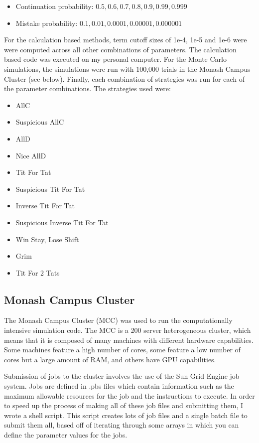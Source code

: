 \documentclass[a4paper,12pt]{article}
\begin{document}
\begin{itemize}
    \item Continuation probability: $0.5, 0.6, 0.7, 0.8, 0.9, 0.99, 0.999$
    \item Mistake probability: $0.1, 0.01, 0.0001, 0.00001, 0.000001$
\end{itemize}

For the calculation based methods, term cutoff sizes of 1e-4, 1e-5 and 1e-6 were were computed across all other combinations of parameters.
The calculation based code was executed on my personal computer.
For the Monte Carlo simulations, the simulations were run with 100,000 trials in the Monash Campus Cluster (see below).
Finally, each combination of strategies was run for each of the parameter combinations.
The strategies used were:

\begin{itemize}
    \item AllC
    \item Suspicious AllC
    \item AllD
    \item Nice AllD
    \item Tit For Tat
    \item Suspicious Tit For Tat
    \item Inverse Tit For Tat
    \item Suspicious Inverse Tit For Tat
    \item Win Stay, Lose Shift
    \item Grim
    \item Tit For 2 Tats
\end{itemize}

\subsection{Monash Campus Cluster}

The Monash Campus Cluster (MCC) was used to run the computationally intensive simulation code.
The MCC is a 200 server heterogeneous cluster, which means that it is composed of many machines with different hardware capabilities.
Some machines feature a high number of cores, some feature a low number of cores but a large amount of RAM, and others have GPU capabilities.

Submission of jobs to the cluster involves the use of the Sun Grid Engine job system.
Jobs are defined in .pbs files which contain information such as the maximum allowable resources for the job and the instructions to execute.
In order to speed up the process of making all of these job files and submitting them, I wrote a shell script.
This script creates lots of job files and a single batch file to submit them all, based off of iterating through some arrays in which you can define the parameter values for the jobs.
\end{document}

